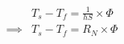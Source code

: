 \documentclass{article}
\begin{document}
\begin{adjustwidth}{-3cm}{-3cm}

\begin{align*}
    &T_s - T_f = \frac{1}{hS} \times \Phi \\
    \implies &\boxed{ T_s - T_f = R_N \times \Phi}
\end{align*}

\end{adjustwidth}
\end{document}
